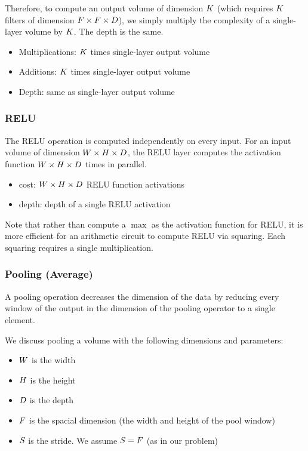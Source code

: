 Therefore, to compute an output volume of dimension $K$
(which requires $K$ filters of dimension $F \times F \times D$),
we simply multiply the complexity of a single-layer volume by $K$. The depth is the same.

\begin{itemize}
	\item Multiplications: $K$ times single-layer output volume
	\item Additions: $K$ times single-layer output volume
	\item Depth: same as single-layer output volume
\end{itemize}


\subsubsection{RELU}
The RELU operation is computed independently on every input. For an input volume of dimension $W \times H \times D$, the RELU layer computes the activation function $W \times H \times D$ times in parallel.

\begin{itemize}
	\item cost: $W \times H \times D$ RELU function activations
	\item depth: depth of a single RELU activation
\end{itemize}

Note that rather than compute a $\max$ as the activation function for RELU, it is more efficient for an arithmetic circuit to compute RELU via squaring. Each squaring requires a single multiplication.


\subsubsection{Pooling (Average)}
A pooling operation decreases the dimension of the data by reducing every window of the output in the dimension of the pooling operator to a single element.

We discuss pooling a volume with the following dimensions and parameters:
\begin{itemize}
	\item $W$ is the width
	\item $H$ is the height
	\item $D$ is the depth
	\item $F$ is the spacial dimension (the width and height of the pool window)
	\item $S$ is the stride. We assume $S=F$ (as in our problem)
\end{itemize}

